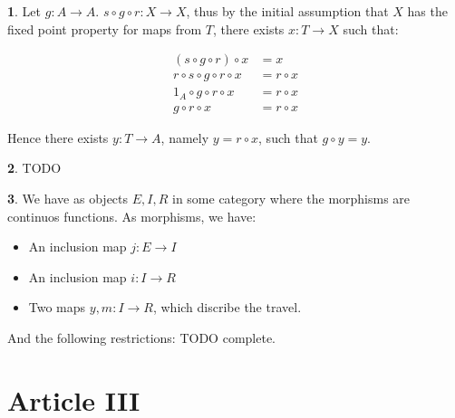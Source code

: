 \documentclass{article}
\theoremstyle{definition}
\theoremstyle{definition}
\theoremstyle{definition}
\newtheorem{solution-internal}{}[subsection]
\newenvironment{solution}{
  \begin{solution-internal}
}{
  \end{solution-internal}
}
\begin{document}
\begin{solution}
  Let $g\colon A \to A$. $s \circ g \circ r \colon X \to X$, thus by the
  initial assumption that $X$ has the fixed point property for maps from $T$,
  there exists $x\colon T \to X$ such that:

  \begin{minipage}{.5\textwidth}
    \begin{align*}
      (s \circ g \circ r) \circ x &= x \\
      r \circ s \circ g \circ r \circ x &= r \circ x\\
      1_A \circ g \circ r \circ x &= r \circ x\\
      g \circ r \circ x &= r \circ x
    \end{align*}
  \end{minipage}%
  \begin{minipage}{.5\textwidth}
    \begin{center}
    \end{center}
  \end{minipage}
  \vspace{12pt}

Hence there exists $y\colon T \to A$, namely $y = r \circ x$, such that $g \circ y = y$.
\end{solution}

\begin{solution}
  TODO
\end{solution}

\begin{solution}
  We have as objects $E, I, R$ in some category where the morphisms are
  continuos functions. As morphisms, we have:
  \begin{itemize}
    \item An inclusion map $j\colon E \to I$
    \item An inclusion map $i\colon I \to R$
    \item Two maps $y, m \colon I \to R$, which discribe the travel.
  \end{itemize}
  And the following restrictions: TODO complete.
\end{solution}

\section*{Article III}
\setcounter{subsection}{3}
\renewcommand{\thesubsection}{\Roman{subsection}}
\setcounter{solution-internal}{0}
\end{document}
